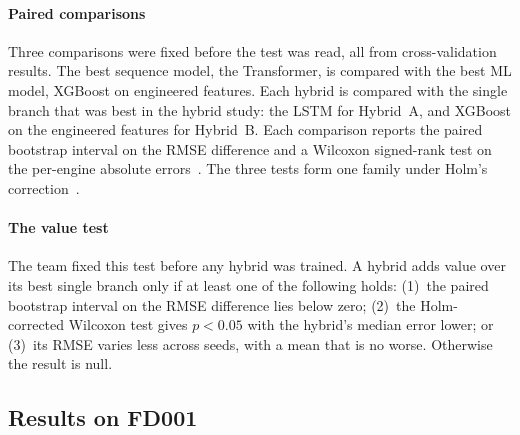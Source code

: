 \paragraph{Paired comparisons}
Three comparisons were fixed before the test was read, all from
cross-validation results. The best sequence model, the Transformer, is
compared with the best ML model, XGBoost on engineered features. Each hybrid
is compared with the single branch that was best in the hybrid study: the
LSTM for Hybrid~A, and XGBoost on the engineered features for Hybrid~B. Each
comparison reports the paired bootstrap interval on the RMSE difference and a
Wilcoxon signed-rank test on the per-engine absolute
errors~\cite{Wilcoxon1945individual}. The three tests form one family under
Holm's correction~\cite{Holm1979simple}.

\paragraph{The value test}
The team fixed this test before any hybrid was trained. A hybrid adds value
over its best single branch only if at least one of the following holds:
(1)~the paired bootstrap interval on the RMSE difference lies below zero;
(2)~the Holm-corrected Wilcoxon test gives $p<0.05$ with the hybrid's median
error lower; or (3)~its RMSE varies less across seeds, with a mean that is no
worse. Otherwise the result is null.

\subsection{Results on FD001}

\begin{table}[t]
\centering
\caption{Official FD001 test, 100 engines scored at their last cycle.
RMSE: mean $\pm$ s.d.\ over seeds (one run for the ML baselines). 95\% CI:
bootstrap over engines for the seed-averaged RMSE. All models are trained
with the cap of 125 except the last column.}
\label{tab:validation_models}
\footnotesize

\end{table}

\begin{table}[t]
\centering
\caption{Paired comparisons on the official FD001 test, cap 125. $\Delta$:
RMSE of A minus B, paired bootstrap 95\% CI. $p_\mathrm{Holm}$: Wilcoxon
signed-rank on per-engine absolute error, Holm-corrected over the three
comparisons. (1)--(3): the value-test criteria, for the hybrids only.
Criterion~(3) cannot be judged for Hybrid~B, whose branch ran with one
seed.}
\label{tab:validation_paired}
\footnotesize

\end{table}

